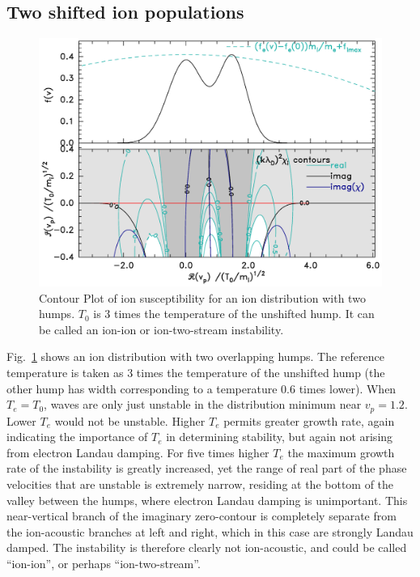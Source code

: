 \documentclass[12pt]{article}
\begin{document}
\subsection{Two shifted ion populations}
\begin{figure}[htp]
  \center\includegraphics[width=.7\hsize]{twogaussLowTe}\endcenter
  \caption{Contour Plot of ion susceptibility for an ion distribution
    with two humps. $T_0$ is 3 times the temperature of the unshifted
    hump. It can be called an ion-ion or ion-two-stream instability.\label{twogausslowTe}}
\end{figure}
Fig.\ \ref{twogausslowTe} shows an ion distribution with two
overlapping humps.  The reference temperature is taken as 3 times the
temperature of the unshifted hump (the other hump has width
corresponding to a temperature 0.6 times lower). When $T_e=T_0$, waves
are only just unstable in the distribution minimum near
$v_p=1.2$. Lower $T_e$ would not be unstable. Higher $T_e$ permits
greater growth rate, again indicating the importance of $T_e$ in
determining stability, but again not arising from electron Landau
damping. For five times higher $T_e$ the maximum growth rate of the
instability is greatly increased, yet the range of real part of the
phase velocities that are unstable is extremely narrow, residing at
the bottom of the valley between the humps, where electron Landau
damping is unimportant. This near-vertical branch of the imaginary
zero-contour is completely separate from the ion-acoustic branches at
left and right, which in this case are strongly Landau damped. The
instability is therefore clearly not ion-acoustic, and could be called
``ion-ion'', or perhaps ``ion-two-stream''. 
\end{document}
